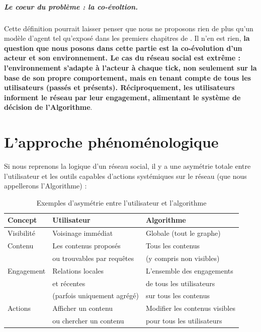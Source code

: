 \documentclass{report}
\begin{document}
	\paragraph{Le coeur du problème : la co-évoltion.} Cette définition pourrait laisser penser que nous ne proposons rien de plus qu'un modèle d'agent tel qu'exposé dans les premiers chapitres de \cite{RussellNorvig}. Il n'en est rien, \textbf{la question que nous posons dans cette partie est la co-évolution d'un acteur et son environnement. Le cas du réseau social est extrême : l'environnement s'adapte à l'acteur à chaque tick, non seulement sur la base de son propre comportement, mais en tenant compte de tous les utilisateurs (passés et présents). Réciproquement, les utilisateurs informent le réseau par leur engagement, alimentant le système de décision de l'Algorithme}. 
	
	
	
	
	\chapter{L'approche phénoménologique}
	
	Si nous reprenons la logique d'un réseau social, il y a une asymétrie totale entre l'utilisateur et les outils capables d'actions systémiques sur le réseau (que nous appellerons l'Algorithme) : 
	
	\begin{table}[H]
		\centering
		\begin{tabular}{|l|l|l|}
			\hline 
			\textbf{Concept} & \textbf{Utilisateur} & \textbf{Algorithme} \\
			\hline 
			Visibilité & Voisinage immédiat  & Globale (tout le graphe) \\
			\hline 
			Contenu & Les contenus proposés & Tous les contenus \\
			& ou trouvables par requêtes & (y compris non visibles) \\
			\hline 
			Engagement & Relations locales  & L'ensemble des engagements \\
			& et récentes & de tous les utilisateurs \\
			& (parfois uniquement agrégé) & sur tous les contenus \\
			\hline 
			Actions & Afficher un contenu & Modifier les contenus visibles \\
			& ou chercher un contenu & pour tous les utilisateurs \\
			\hline 
		\end{tabular}
		\caption{Exemples d'asymétrie entre l'utilisateur et l'algorithme} 
	\end{table}
	
\end{document}
